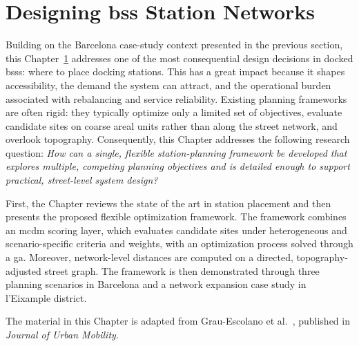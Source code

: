 \chapter[Designing BSS Station Networks]{Designing \ac{bss} Station Networks}
\label{ch:station_planning_in_barcelona}


Building on the Barcelona case-study context presented in the previous section, this Chapter~\ref{ch:station_planning_in_barcelona} addresses one of the most consequential design decisions in docked \acp{bss}: where to place docking stations. This has a great impact because it shapes accessibility, the demand the system can attract, and the operational burden associated with rebalancing and service reliability. Existing planning frameworks are often rigid: they typically optimize only a limited set of objectives, evaluate candidate sites on coarse areal units rather than along the street network, and overlook topography. Consequently, this Chapter addresses the following research question: \emph{How can a single, flexible station-planning framework be developed that explores multiple, competing planning objectives and is detailed enough to support practical, street-level system design?}

First, the Chapter reviews the state of the art in station placement and then presents the proposed flexible optimization framework. The framework combines an \ac{mcdm} scoring layer, which evaluates candidate sites under heterogeneous and scenario-specific criteria and weights, with an optimization process solved through a \ac{ga}. Moreover, network-level distances are computed on a directed, topography-adjusted street graph. The framework is then demonstrated through three planning scenarios in Barcelona and a network expansion case study in l'Eixample district.

The material in this Chapter is adapted from Grau-Escolano et al.~\cite{GrauEscolano2025}, published in \textit{Journal of Urban Mobility}.





